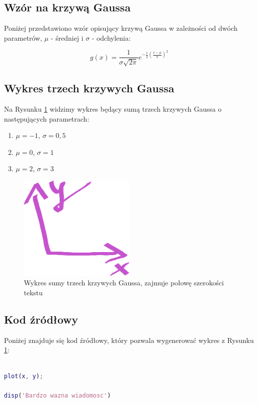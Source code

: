 \documentclass[10pt,a4paper]{article}
\begin{document}
	\subsection{Wzór na krzywą Gaussa}
	
	Poniżej przedstawiono wzór opisujący krzywą Gaussa w zależności od dwóch parametrów, $\mu$ - średniej i $\sigma$ - odchylenia:
	
	\begin{equation}
		g(x) = \frac{1}{\sigma \sqrt{2 \pi}}e^{-\frac{1}{2}\left(\frac{x-\mu}{\sigma}\right)^2}
	\end{equation}
	
	\subsection{Wykres trzech krzywych Gaussa}
	
	Na Rysunku \ref{wykres} widzimy wykres będący sumą trzech krzywych Gaussa o następujących parametrach:
	\begin{enumerate}
		\item $\mu = -1$, $\sigma = 0,5$
		\item $\mu = 0$, $\sigma = 1$
		\item $\mu = 2$, $\sigma = 3$
	\end{enumerate}

	\begin{figure}[h]
		\centering
		\includegraphics[width=0.5\textwidth]{wykres.eps}
		\caption{Wykres sumy trzech krzywych Gaussa, zajmuje połowę szerokości tekstu}
		\label{wykres}
	\end{figure}

	\subsection{Kod źródłowy}
	
	Poniżej znajduje się kod źródłowy, który pozwala wygenerować wykres z Rysunku \ref{wykres}:
	
	\begin{lstlisting}[language=matlab]
%TUTAJ WSTAW KOD ZRODLOWY, KTORY NAPISZESZ REALIZAUJAC ZADANIE 1

plot(x, y);

disp('Bardzo wazna wiadomosc')
	\end{lstlisting}
	
\end{document}
